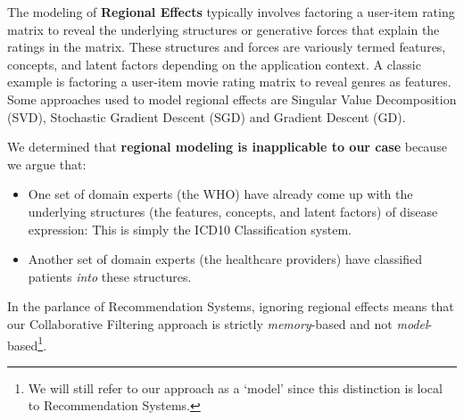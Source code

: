\documentclass[twoside,11pt]{article}
\begin{document}
The modeling of \textbf{Regional Effects} typically involves factoring a user-item rating matrix to reveal the underlying structures or generative forces that explain the ratings in the matrix. These structures and forces are variously termed features, concepts, and latent factors depending on the application context. A classic example is factoring a user-item movie rating matrix to reveal genres as features. Some approaches used to model regional effects are Singular Value Decomposition (SVD), Stochastic Gradient Descent (SGD) and Gradient Descent (GD).

We determined that \textbf{regional modeling is inapplicable to our case} because we argue that:
\begin{itemize}
  \item One set of domain experts (the WHO) have already come up with the underlying structures (the features, concepts, and latent factors) of disease expression: This is simply the ICD10 Classification system.
  \item Another set of domain experts (the healthcare providers) have classified patients \textit{into} these structures.
\end{itemize}

In the parlance of Recommendation Systems, ignoring regional effects means that our Collaborative Filtering approach is strictly \textit{memory}-based and not \textit{model}-based\footnote{We will still refer to our approach as a `model' since this distinction is local to Recommendation Systems.}.
\end{document}
